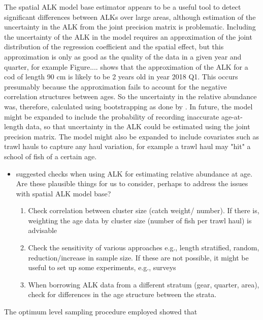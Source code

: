 \documentclass[a4paper 12pt]{article}
\numberwithin{equation}{section}
\begin{document}
The spatial ALK model base estimator appears to be a useful tool to detect significant differences between ALKs over large areas, although estimation of the uncertainty in the ALK from the joint precision matrix is problematic. Including the uncertainty of the ALK in the model requires an approximation of the joint distribution of the regression coefficient and the spatial effect, but this approximation is only as good as the quality of the data in a given year and quarter, for example Figure.... shows that the approximation of the ALK for a cod of length 90 cm is likely to be 2 years old in year 2018 Q1. This occurs presumably because the approximation fails to account for the negative correlation structures between ages. So the uncertainty in the relative abundance was, therefore, calculated using bootstrapping as done by \citet{berg2012spatial,berg2014evaluation}. In future, the model might be expanded to include the probability of recording inaccurate age-at-length data, so that uncertainty in the ALK could be estimated using the joint precision matrix. The model might also be expanded to include covariates such as trawl hauls to capture any haul variation, for example a trawl haul may "hit" a school of fish  of a certain age. 

\begin{itemize}
\item \citet{aanes2015efficient} suggested checks when using ALK for estimating relative abundance at age. Are these plausible things for us to consider, perhaps to address the issues with spatial ALK model base?
\begin{enumerate}
\item Check correlation between cluster size (catch weight/ number). If there is, weighting the age data by cluster size (number of fish per trawl haul) is advisable
\item Check the sensitivity of various approaches e.g., length stratified, random, reduction/increase in sample size. If these are not possible, it might be useful to set up some experiments, e.g., surveys
\item When borrowing ALK data from a different stratum (gear, quarter, area), check for differences in the age structure between the strata.
\end{enumerate}
\end{itemize}

The optimum level sampling procedure employed showed that  

\end{document}
